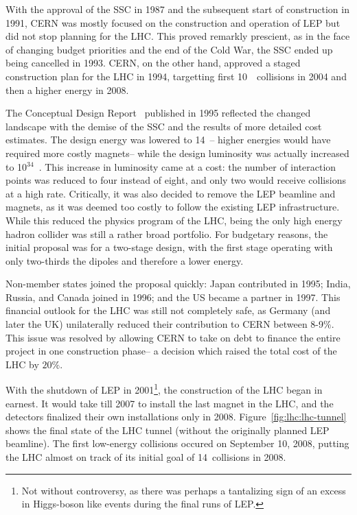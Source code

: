 
With the approval of the SSC in 1987 and the subsequent start of construction in 1991, CERN was mostly focused on the construction and operation of LEP but did not stop planning for the LHC. This proved remarkly prescient, as in the face of changing budget priorities and the end of the Cold War, the SSC ended up being cancelled in 1993.  CERN, on the other hand, approved a staged construction plan for the LHC in 1994, targetting first 10~\TeV~collisions in 2004 and then a higher energy in 2008. 

The Conceptual Design Report~\cite{LHCCDR} published in 1995 reflected the changed landscape with the demise of the SSC and the results of more detailed cost estimates. The design energy was lowered to 14~\TeV-- higher energies would have required more costly magnets-- while the design luminosity was actually increased to 10$^{34}$~\lumirate. This increase in luminosity came at a cost: the number of interaction points was reduced to four instead of eight, and only two would receive collisions at a high rate.  Critically, it was also decided to remove the LEP beamline and magnets, as it was deemed too costly to follow the existing LEP infrastructure. While this reduced the physics program of the LHC, being the only high energy hadron collider was still a rather broad portfolio. For budgetary reasons, the initial proposal was for a two-stage design, with the first stage operating with only two-thirds the dipoles and therefore a lower energy.

Non-member states joined the proposal quickly: Japan contributed in 1995; India, Russia, and Canada joined in 1996; and the US became a partner in 1997. This financial outlook for the LHC was still not completely safe, as Germany (and later the UK) unilaterally reduced their contribution to CERN between 8-9$\%$. This issue was resolved by allowing CERN to take on debt to finance the entire project in one construction phase-- a decision which raised the total cost of the LHC by $20\%$.


With the shutdown of LEP in 2001\footnote{Not without controversy, as there was perhaps a tantalizing sign of an excess in Higgs-boson like events during the final runs of LEP.}, the construction of the LHC began in earnest. It would take till 2007 to install the last magnet in the LHC, and the detectors finalized their own installations only in 2008. Figure~\ref{fig:lhc:lhc-tunnel} shows the final state of the LHC tunnel (without the originally planned LEP beamline). The first low-energy collisions occured on September 10, 2008, putting the LHC almost on track of its initial goal of 14~\TeV collisions in 2008. 

